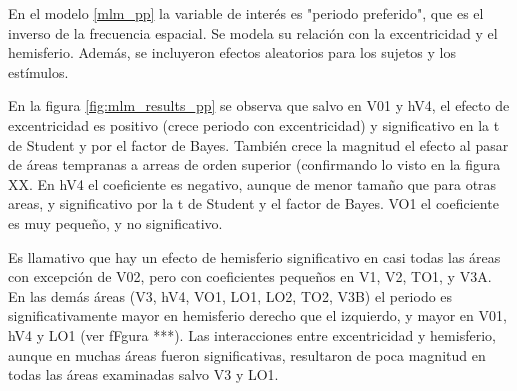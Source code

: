 En el modelo \ref{mlm_pp} la variable de interés es "periodo preferido", que es el inverso de la frecuencia espacial. Se modela su relación con la excentricidad y el hemisferio. Además, se incluyeron efectos aleatorios para los sujetos y los estímulos. 

En la figura \ref{fig:mlm_results_pp} se observa que salvo en V01 y hV4, el efecto de excentricidad es positivo (crece periodo con excentricidad) y significativo en la t de Student y por el factor de Bayes.  También crece la magnitud el efecto al pasar de áreas tempranas a arreas de orden superior (confirmando lo visto en la figura XX.  En hV4 el coeficiente es negativo, aunque de menor tamaño que para otras areas, y significativo por la t de Student y el factor de Bayes. VO1 el coeficiente es muy pequeño, y no significativo.

Es llamativo que hay un efecto de hemisferio significativo en casi todas las áreas con excepción de V02, pero con coeficientes pequeños en V1, V2, TO1, y V3A. En las demás áreas (V3, hV4, VO1, LO1, LO2, TO2, V3B) el periodo es significativamente mayor en hemisferio derecho que el izquierdo, y mayor en V01, hV4 y LO1 (ver fFgura ***). Las interacciones entre excentricidad y hemisferio, aunque en muchas áreas fueron significativas, resultaron de poca magnitud en todas las áreas examinadas salvo V3 y LO1.




